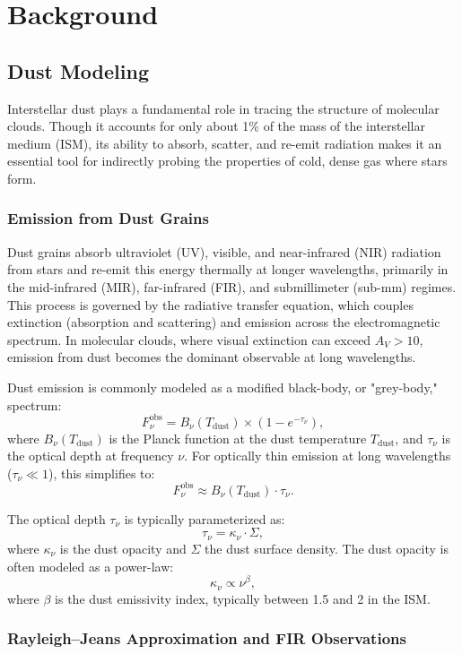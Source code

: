 \chapter{Background}
\label{chap:background}

\section{Dust Modeling}

Interstellar dust plays a fundamental role in tracing the structure of molecular clouds. Though it accounts for only about 1\% of the mass of the interstellar medium (ISM), its ability to absorb, scatter, and re-emit radiation makes it an essential tool for indirectly probing the properties of cold, dense gas where stars form.

\subsection{Emission from Dust Grains}

Dust grains absorb ultraviolet (UV), visible, and near-infrared (NIR) radiation from stars and re-emit this energy thermally at longer wavelengths, primarily in the mid-infrared (MIR), far-infrared (FIR), and submillimeter (sub-mm) regimes. This process is governed by the radiative transfer equation, which couples extinction (absorption and scattering) and emission across the electromagnetic spectrum. In molecular clouds, where visual extinction can exceed $A_V > 10$, emission from dust becomes the dominant observable at long wavelengths.

Dust emission is commonly modeled as a modified black-body, or "grey-body," spectrum:
\[
F_\nu^{\mathrm{obs}} = B_\nu(T_\mathrm{dust}) \times \left(1 - e^{-\tau_\nu}\right),
\]
where $B_\nu(T_\mathrm{dust})$ is the Planck function at the dust temperature $T_\mathrm{dust}$, and $\tau_\nu$ is the optical depth at frequency $\nu$. For optically thin emission at long wavelengths ($\tau_\nu \ll 1$), this simplifies to:
\[
F_\nu^{\mathrm{obs}} \approx B_\nu(T_\mathrm{dust}) \cdot \tau_\nu.
\]

The optical depth $\tau_\nu$ is typically parameterized as:
\[
\tau_\nu = \kappa_\nu \cdot \Sigma,
\]
where $\kappa_\nu$ is the dust opacity and $\Sigma$ the dust surface density. The dust opacity is often modeled as a power-law:
\[
\kappa_\nu \propto \nu^\beta,
\]
where $\beta$ is the dust emissivity index, typically between 1.5 and 2 in the ISM.

\subsection{Rayleigh–Jeans Approximation and FIR Observations}

